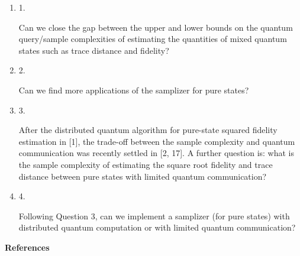 \begin{enumerate}


\item[] 
1. 


Can we close the gap between the upper and lower bounds on the quantum query/sample complexities of estimating the quantities of mixed quantum states such as trace distance and fidelity?\par





\item[] 
2. 


Can we find more applications of the samplizer for pure states?\par





\item[] 
3. 


After the distributed quantum algorithm for pure-state squared fidelity estimation in [1], the trade-off between the sample complexity and quantum communication was recently settled in [2, 17].
A further question is: what is the sample complexity of estimating the square root fidelity and trace distance between pure states with limited quantum communication?\par





\item[] 
4. 


Following Question 3, can we implement a samplizer (for pure states) with distributed quantum computation or with limited quantum communication?\par





\end{enumerate}





\par\medskip\noindent\textbf{References}\par



